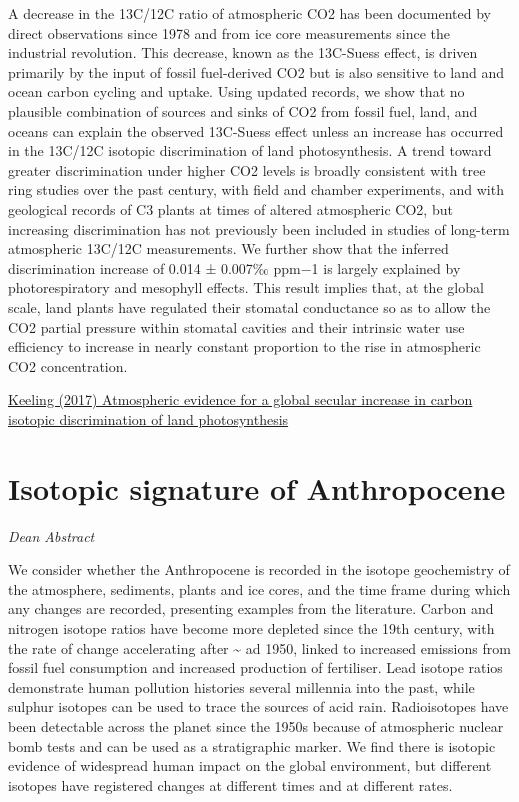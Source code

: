 \documentclass[
]{book}
\begin{document}
A decrease in the 13C/12C ratio of atmospheric CO2 has been documented by direct observations since 1978 and from ice core measurements since the industrial revolution. This decrease, known as the 13C-Suess effect, is driven primarily by the input of fossil fuel-derived CO2 but is also sensitive to land and ocean carbon cycling and uptake. Using updated records, we show that no plausible combination of sources and sinks of CO2 from fossil fuel, land, and oceans can explain the observed 13C-Suess effect unless an increase has occurred in the 13C/12C isotopic discrimination of land photosynthesis. A trend toward greater discrimination under higher CO2 levels is broadly consistent with tree ring studies over the past century, with field and chamber experiments, and with geological records of C3 plants at times of altered atmospheric CO2, but increasing discrimination has not previously been included in studies of long-term atmospheric 13C/12C measurements. We further show that the inferred discrimination increase of 0.014 ± 0.007‰ ppm−1 is largely explained by photorespiratory and mesophyll effects. This result implies that, at the global scale, land plants have regulated their stomatal conductance so as to allow the CO2 partial pressure within stomatal cavities and their intrinsic water use efficiency to increase in nearly constant proportion to the rise in atmospheric CO2 concentration.

\href{https://www.pnas.org/content/114/39/10361}{Keeling (2017) Atmospheric evidence for a global secular increase in carbon isotopic discrimination of land photosynthesis}

\hypertarget{isotopic-signature-of-anthropocene}{%
\section{Isotopic signature of Anthropocene}\label{isotopic-signature-of-anthropocene}}

\emph{Dean Abstract}

We consider whether the Anthropocene is recorded in the isotope geochemistry of the
atmosphere, sediments, plants and ice cores, and the time frame during which any changes are
recorded, presenting examples from the literature. Carbon and nitrogen isotope ratios have
become more depleted since the 19th century, with the rate of change accelerating after \textasciitilde{} ad
1950, linked to increased emissions from fossil fuel consumption and increased production of
fertiliser. Lead isotope ratios demonstrate human pollution histories several millennia into the
past, while sulphur isotopes can be used to trace the sources of acid rain. Radioisotopes have
been detectable across the planet since the 1950s because of atmospheric nuclear bomb tests and
can be used as a stratigraphic marker. We find there is isotopic evidence of widespread human
impact on the global environment, but different isotopes have registered changes at different
times and at different rates.
\end{document}
